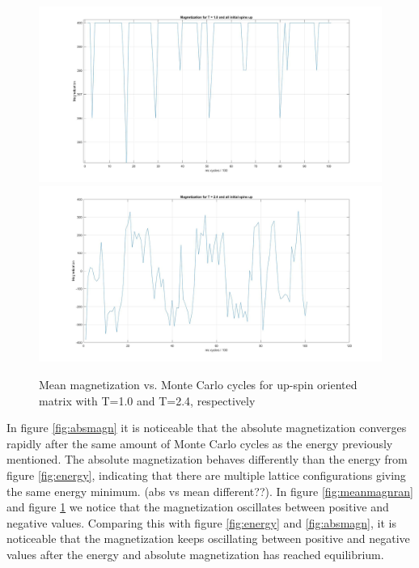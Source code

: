 \documentclass[10pt,a4paper]{article}
\begin{document}
\begin{figure}[H]
\centerline{
\includegraphics[scale=0.15]{magnetizationT1upspin}
\includegraphics[scale=0.15]{magnetizationT24upspin}
}
\caption{Mean magnetization vs. Monte Carlo cycles for up-spin oriented matrix with T=1.0 and T=2.4, respectively}
\label{fig:meanmagnup}
\end{figure}

\noindent In figure \ref{fig:absmagn} it is noticeable that the absolute magnetization converges rapidly after the same amount of Monte Carlo cycles as the energy previously mentioned. The absolute magnetization behaves differently than the energy from figure \ref{fig:energy}, indicating that there are multiple lattice configurations giving the same energy minimum. (abs vs mean different??).
In figure \ref{fig:meanmagnran} and figure \ref{fig:meanmagnup} we notice that the magnetization oscillates between positive and negative values. Comparing this with figure \ref{fig:energy} and \ref{fig:absmagn}, it is noticeable that the magnetization keeps oscillating between positive and negative values after the energy and absolute magnetization has reached equilibrium.\\
\end{document}
